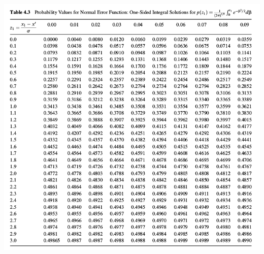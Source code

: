\documentclass[11pt]{article}
\begin{document}
\begin{itemize}
\begin{itemize}
		\newpage
		\newpage
		\includegraphics[scale=.8]{lecture1_fig3.png}

\end{itemize}

\end{itemize}

	
\end{document}
